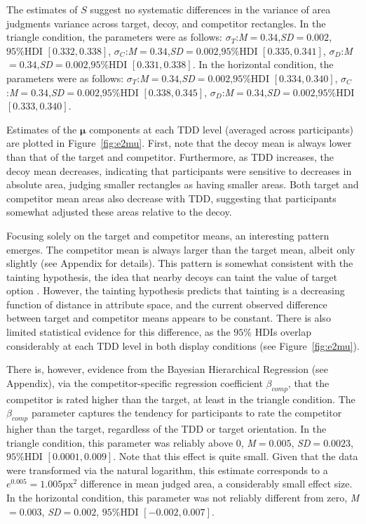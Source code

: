 The estimates of $S$ suggest no systematic differences in the variance of area judgments variance across target, decoy, and competitor rectangles. In the triangle condition, the parameters were as follows: $\sigma_{T}$:\textit{M}$=0.34$,\textit{SD}$=0.002$,$95\%\text{HDI}$ $[0.332,0.338]$, $\sigma_{C}$:\textit{M}$=0.34$,\textit{SD}$=0.002$,$95\%\text{HDI}$ $[0.335,0.341]$, $\sigma_{D}$:\textit{M}$=0.34$,\textit{SD}$=0.002$,$95\%\text{HDI}$ $[0.331,0.338]$. In the horizontal condition, the parameters were as follows: $\sigma_{T}$:\textit{M}$=0.34$,\textit{SD}$=0.002$,$95\%\text{HDI}$ $[0.334,0.340]$, $\sigma_{C}$:\textit{M}$=0.34$,\textit{SD}$=0.002$,$95\%\text{HDI}$ $[0.338,0.345]$, $\sigma_{D}$:\textit{M}$=0.34$,\textit{SD}$=0.002$,$95\%\text{HDI}$ $[0.333,0.340]$. 

Estimates of the $\boldsymbol{\mu}$ components at each TDD level (averaged across participants) are plotted in Figure~\ref{fig:e2mu}. First, note that the decoy mean is always lower than that of the target and competitor. Furthermore, as TDD increases, the decoy mean decreases, indicating that participants were sensitive to decreases in absolute area, judging smaller rectangles as having smaller areas. Both target and competitor mean areas also decrease with TDD, suggesting that participants somewhat adjusted these areas relative to the decoy. 

Focusing solely on the target and competitor means, an interesting pattern emerges. The competitor mean is always larger than the target mean, albeit only slightly (see Appendix for details). This pattern is somewhat consistent with the tainting hypothesis, the idea that nearby decoys can taint the value of target option \parencite{simonson2014vices}. However, the tainting hypothesis predicts that tainting is a decreasing function of distance in attribute space, and the current observed difference between target and competitor means appears to be constant. There is also limited statistical evidence for this difference, as the $95\%$ HDIs overlap considerably at each TDD level in both display conditions (see Figure~\ref{fig:e2mu}). 

There is, however, evidence from the Bayesian Hierarchical Regression (see Appendix), via the competitor-specific regression coefficient $\beta_{comp}$, that the competitor is rated higher than the target, at least in the triangle condition. The $\beta_{comp}$ parameter captures the tendency for participants to rate the competitor higher than the target, regardless of the TDD or target orientation. In the triangle condition, this parameter was reliably above 0, \textit{M}$=0.005$, \textit{SD}$=0.0023$, $95\%\text{HDI}$ $[0.0001,0.009]$. Note that this effect is quite small. Given that the data were transformed via the natural logarithm, this estimate corresponds to a $e^{0.005}=1.005\text{px}^2$ difference in mean judged area, a considerably small effect size. In the horizontal condition, this parameter was not reliably different from zero, \textit{M}$=0.003$, \textit{SD}$=0.002$, $95\%\text{HDI}$ $[-0.002,0.007]$. 

